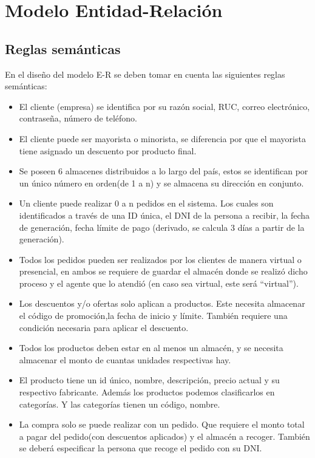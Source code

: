\documentclass[10pt, a4paper,openany]{report}
\begin{document}
\chapter{Modelo Entidad-Relación}
\label{cap:Modelo Entidad-Relación}

\section{Reglas semánticas}
\label{sec:Reglas semánticas}

\noindent En el diseño del modelo E-R se deben tomar en cuenta las siguientes reglas semánticas:
\begin{itemize}
	\item El cliente (empresa) se identifica por su razón social, RUC, correo electrónico, contraseña, número de teléfono.
	\item El cliente puede ser mayorista o minorista, se diferencia por que el mayorista tiene asignado un descuento por producto final.
	\item Se poseen 6 almacenes distribuidos a lo largo del país, estos se identifican por un único número en orden(de 1 a n) y se almacena su dirección en conjunto.
	\item Un cliente puede realizar 0 a n pedidos en el sistema. Los cuales son identificados a través de una ID única, el DNI de la persona a recibir, la fecha de generación, fecha límite de pago (derivado, se calcula 3 días a partir de la generación).
	\item Todos los pedidos pueden ser realizados por los clientes de manera virtual o presencial, en ambos se requiere de guardar el almacén donde se realizó dicho proceso y el agente que lo atendió (en caso sea virtual, este será “virtual”).
	\item Los descuentos y/o ofertas solo aplican a productos. Este necesita almacenar el código de promoción,la fecha de inicio y límite. También requiere una condición necesaria para aplicar el descuento.
	\item Todos los productos deben estar en al menos un almacén, y se necesita almacenar el monto de cuantas unidades respectivas hay.
	\item El producto tiene un id único, nombre, descripción, precio actual y su respectivo fabricante. Además los productos podemos clasificarlos en categorías. Y las categorías tienen un código, nombre.
	\item La compra solo se puede realizar con un pedido. Que requiere el monto total a pagar del pedido(con descuentos aplicados) y el almacén a recoger. También se deberá especificar la persona que recoge el pedido con su DNI.

\end{itemize}
\end{document}
